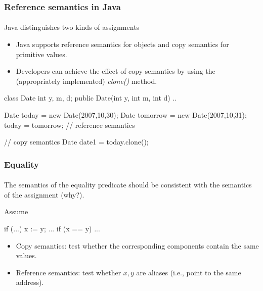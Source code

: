 \documentclass{beamer}
\begin{document}
\begin{frame}[fragile]
\frametitle{Reference semantics in Java}
\framesubtitle{}
Java distinguishes two kinds of assignments 
\begin{itemize}
\item Java supports reference semantics for objects and copy semantics
for primitive values.
\item Developers can achieve the effect of copy semantics by using
the (appropriately implemented) \textit{clone()} method.
\end{itemize}

\begin{java}
class Date 
{
    int y, m, d;
    public Date(int y, int m, int d) {..}
}

Date today    = new Date(2007,10,30);
Date tomorrow = new Date(2007,10,31);
today = tomorrow;    // reference semantics

// copy semantics 
Date date1 = today.clone();
\end{java}
\end{frame}



\begin{frame}[fragile]
\frametitle{Equality}
\framesubtitle{}
The semantics of the equality predicate should be consistent with
the semantics of the assignment (why?).

Assume 
\begin{cplus3}
          if (...) { x := y; } 
          ...
          if (x == y) ... 
\end{cplus3}
\begin{itemize}
\item Copy semantics: test whether the corresponding components contain
the same values.
\item Reference semantics: test whether $x,y$ are aliases (i.e., point
to the same address). 
\end{itemize}
\end{frame}
\end{document}
